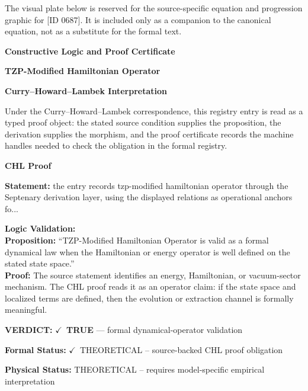 \begingroup\footnotesize\sloppy
The visual plate below is reserved for the source-specific equation and progression graphic for [ID 0687]. It is included only as a companion to the canonical equation, not as a substitute for the formal text.
\par\endgroup
\ifTZPDarkEdition
{}
\fi

\clearpage
\begingroup\tzpsupportsetup
\noindent\textbf{\fontsize{10.8pt}{12.8pt}\selectfont [ID 0687] Constructive Logic and Proof Certificate}\par
\noindent\textbf{\fontsize{10pt}{12pt}\selectfont TZP-Modified Hamiltonian Operator}\par
\vspace{0.45em}
\begingroup
\footnotesize
\setlength{\parskip}{0.22em}
\setlength{\parindent}{0pt}
\noindent\textbf{Curry--Howard--Lambek Interpretation}\par
Under the Curry--Howard--Lambek correspondence, this registry entry is read as a typed proof
object: the stated source condition supplies the proposition, the derivation supplies the
morphism, and the proof certificate records the machine handles needed to check the obligation
in the formal registry.

\vspace{0.45em}
\noindent\textbf{CHL Proof}\par
\textbf{Statement:} the entry records tzp-modified hamiltonian operator through the Septenary derivation
layer, using the displayed relations as operational anchors fo...

\textbf{Logic Validation:}\\
\textbf{Proposition:} ``TZP-Modified Hamiltonian Operator is valid as a formal dynamical law when the
Hamiltonian or energy operator is well defined on the stated state space.''\\
\textbf{Proof:} The source statement identifies an energy, Hamiltonian, or vacuum-sector mechanism. The
CHL proof reads it as an operator claim: if the state space and localized terms are
defined, then the evolution or extraction channel is formally meaningful.

\textbf{VERDICT:} \ensuremath{\checkmark}\ \textbf{TRUE} --- formal dynamical-operator validation

\textbf{Formal Status:} \ensuremath{\checkmark}\ THEORETICAL -- source-backed CHL proof obligation

\textbf{Physical Status:} THEORETICAL -- requires model-specific empirical interpretation
\par\vspace{0.45em}
\par
\ifTZPDarkEdition
{}
\fi
\endgroup
\endgroup
